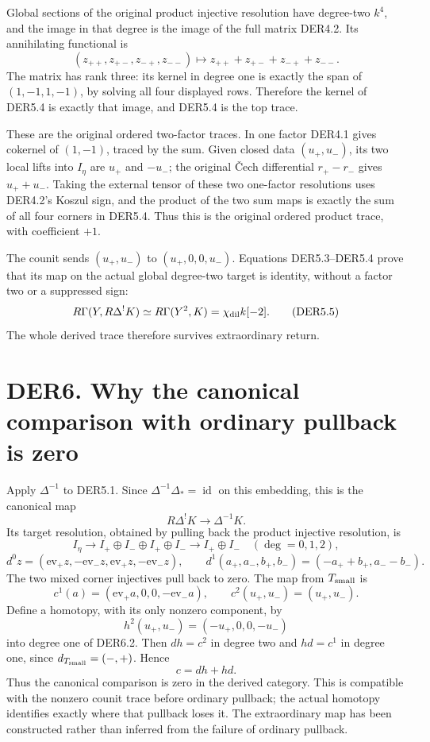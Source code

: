 Global sections of the original product injective resolution have
degree-two \(k^4\), and the image in that degree is the image of the
full matrix DER4.2. Its annihilating functional is \[
(z_{++},z_{+-},z_{-+},z_{--})
 \longmapsto z_{++}+z_{+-}+z_{-+}+z_{--}.
\tag{DER5.4}
\] The matrix has rank three: its kernel in degree one is exactly the
span of \((1,-1,1,-1)\), by solving all four displayed rows. Therefore
the kernel of DER5.4 is exactly that image, and DER5.4 is the top trace.

These are the original ordered two-factor traces. In one factor DER4.1
gives cokernel of \((1,-1)\), traced by the sum. Given closed data
\((u_+,u_-)\), its two local lifts into \(I_\eta\) are \(u_+\) and
\(-u_-\); the original Čech differential \(r_+-r_-\) gives \(u_++u_-\).
Taking the external tensor of these two one-factor resolutions uses
DER4.2's Koszul sign, and the product of the two sum maps is exactly the
sum of all four corners in DER5.4. Thus this is the original ordered
product trace, with coefficient \(+1\).

The counit sends \((u_+,u_-)\) to \((u_+,0,0,u_-)\). Equations
DER5.3--DER5.4 prove that its map on the actual global degree-two target
is identity, without a factor two or a suppressed sign: \[
R\Gamma(Y,R\Delta^!K)\simeq
R\Gamma(Y^2,K)=\chi_{\rm dil}k[-2].
\tag{DER5.5}
\] The whole derived trace therefore survives extraordinary return.

\section{DER6. Why the canonical comparison with ordinary pullback is
zero}\label{der6.-why-the-canonical-comparison-with-ordinary-pullback-is-zero}

Apply \(\Delta^{-1}\) to DER5.1. Since
\(\Delta^{-1}\Delta_*=\operatorname{id}\) on this embedding, this is the
canonical map \[
R\Delta^!K\longrightarrow\Delta^{-1}K.
\tag{DER6.1}
\] Its target resolution, obtained by pulling back the product injective
resolution, is \[
I_\eta\longrightarrow
I_+\oplus I_-\oplus I_+\oplus I_-
\longrightarrow I_+\oplus I_-
\quad(\deg=0,1,2),
\] \[
d^0z=(\mathrm{ev}_+z,-\mathrm{ev}_-z,
       \mathrm{ev}_+z,-\mathrm{ev}_-z),\qquad
d^1(a_+,a_-,b_+,b_-)=(-a_++b_+,a_--b_-).
\tag{DER6.2}
\] The two mixed corner injectives pull back to zero. The map from
\(T_{\rm small}\) is \[
c^1(a)=(\mathrm{ev}_+a,0,0,-\mathrm{ev}_-a),\qquad
c^2(u_+,u_-)=(u_+,u_-).
\] Define a homotopy, with its only nonzero component, by \[
h^2(u_+,u_-)=(-u_+,0,0,-u_-)
\] into degree one of DER6.2. Then \(d h=c^2\) in degree two and
\(h d=c^1\) in degree one, since \(d_{T_{\rm small}}=(-,+)\). Hence \[
\boxed{c=dh+hd.}
\tag{DER6.3}
\] Thus the canonical comparison is zero in the derived category. This
is compatible with the nonzero counit trace before ordinary pullback;
the actual homotopy identifies exactly where that pullback loses it. The
extraordinary map has been constructed rather than inferred from the
failure of ordinary pullback.

